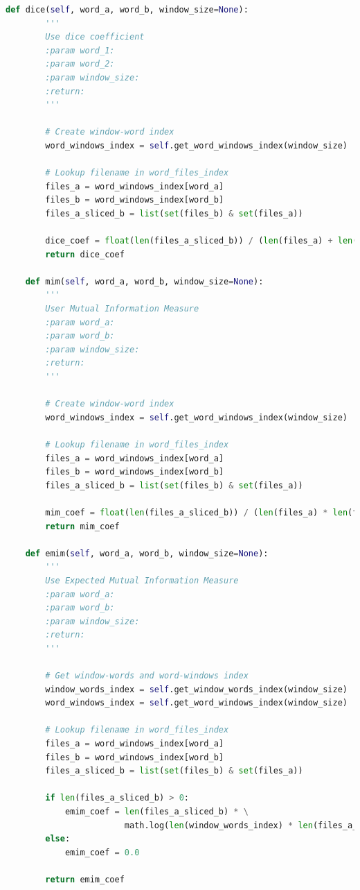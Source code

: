 \documentclass[letterpaper,11pt]{article}
\begin{document}
\begin{lstlisting}[language=python, caption={Association Measure}, label={lst:assoc_measure}]
    def dice(self, word_a, word_b, window_size=None):
        '''
        Use dice coefficient
        :param word_1:
        :param word_2:
        :param window_size:
        :return:
        '''

        # Create window-word index
        word_windows_index = self.get_word_windows_index(window_size)

        # Lookup filename in word_files_index
        files_a = word_windows_index[word_a]
        files_b = word_windows_index[word_b]
        files_a_sliced_b = list(set(files_b) & set(files_a))

        dice_coef = float(len(files_a_sliced_b)) / (len(files_a) + len(files_b))
        return dice_coef

    def mim(self, word_a, word_b, window_size=None):
        '''
        User Mutual Information Measure
        :param word_a:
        :param word_b:
        :param window_size:
        :return:
        '''

        # Create window-word index
        word_windows_index = self.get_word_windows_index(window_size)

        # Lookup filename in word_files_index
        files_a = word_windows_index[word_a]
        files_b = word_windows_index[word_b]
        files_a_sliced_b = list(set(files_b) & set(files_a))

        mim_coef = float(len(files_a_sliced_b)) / (len(files_a) * len(files_b))
        return mim_coef

    def emim(self, word_a, word_b, window_size=None):
        '''
        Use Expected Mutual Information Measure
        :param word_a:
        :param word_b:
        :param window_size:
        :return:
        '''

        # Get window-words and word-windows index
        window_words_index = self.get_window_words_index(window_size)
        word_windows_index = self.get_word_windows_index(window_size)

        # Lookup filename in word_files_index
        files_a = word_windows_index[word_a]
        files_b = word_windows_index[word_b]
        files_a_sliced_b = list(set(files_b) & set(files_a))

        if len(files_a_sliced_b) > 0:
            emim_coef = len(files_a_sliced_b) * \
                        math.log(len(window_words_index) * len(files_a_sliced_b) / float(len(files_a) * len(files_b)))
        else:
            emim_coef = 0.0

        return emim_coef


\end{lstlisting}
\end{document}
